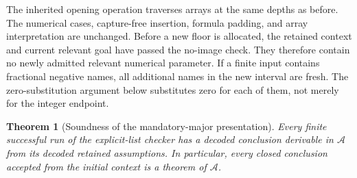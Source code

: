\documentclass[11pt,letterpaper]{article}
\newtheorem{theorem}{Theorem}[section]
\theoremstyle{definition}\newtheorem{definition}[theorem]{Definition}
\theoremstyle{remark}\newtheorem{remark}[theorem]{Remark}
\begin{document}
The inherited opening operation traverses arrays at the same depths as
before.  The numerical cases, capture-free insertion, formula padding,
and array interpretation are unchanged.  Before a new floor is allocated,
the retained context and current relevant goal have passed the no-image
check.  They therefore contain no newly admitted relevant numerical
parameter.  If a finite input contains fractional negative names, all
additional names in the new interval are fresh.  The zero-substitution
argument below substitutes zero for each of them, not merely for the
integer endpoint.

\begin{theorem}[Soundness of the mandatory-major presentation]
Every finite successful run of the explicit-list checker has a decoded
conclusion derivable in $\mathcal A$ from its decoded retained
assumptions.  In particular, every closed conclusion accepted from the
initial context is a theorem of $\mathcal A$.
\end{theorem}
\end{document}
